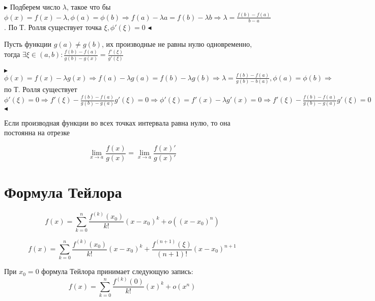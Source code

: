 \documentclass[14pt]{extreport}
\begin{document}
    $\blacktriangleright$
        Подберем число $\lambda$, такое что бы $\phi(x) = f(x) - \lambda, \phi(a) = \phi(b) \Rightarrow f(a) - \lambda a = f(b) - \lambda b \Rightarrow \lambda = \frac{f(b) - f(a)}{b-a}$. По Т. Ролля существует точка $\xi, \phi'(\xi) = 0 $
    $\blacktriangleleft$

    \begin{theorem}
        Пусть функции $g(a) \ne g(b)$, их производные не равны нулю одновременно, тогда $\exists \xi \in (a,b): \frac{f(b) - f(a)}{g(b) - g(x)} = \frac{f'(\xi)}{g'(\xi)}$
    \end{theorem}

    $\blacktriangleright$
        $\phi(x) = f(x) - \lambda g(x) \Rightarrow f(a) - \lambda g(a) = f(b) - \lambda g(b) \Rightarrow \lambda = \frac{f(b) - f(a)}{g(b) - b(a)}, \phi(a) = \phi(b) \Rightarrow$ по Т. Ролля существует $\phi'(\xi) = 0 \Rightarrow f'(\xi) - \frac{f(b) - f(a)}{g(b) - g(a)}g'(\xi) = 0 \Rightarrow \phi'(\xi ) = f'(x) - \lambda g'(x) = 0 \Rightarrow f'(\xi) - \frac{f(b) - f(a)}{g(b) - g(a)} g'(\xi) = 0$ 
    $\blacktriangleleft$

    \begin{theorem}
        Если производная функции во всех точках интервала равна нулю, то она постоянна на отрезке
    \end{theorem}

    \begin{theorem}
        $$\lim_{x\rightarrow a}\frac{f(x)}{g(x)} = \lim_{x\rightarrow a}\frac{f(x)'}{g(x)'} $$
    \end{theorem}

    \section{Формула Тейлора}

    \begin{theorem}
        $$f(x) = \sum^n_{k=0}\frac{f^{(k)} (x_0)}{k!}(x-x_0)^{k} + o((x-x_0)^n)$$
    \end{theorem}

    \begin{theorem}
        $$f(x) = \sum^n_{k=0}\frac{f^{(k)} (x_0)}{k!}(x-x_0)^{k} + \frac{f^{(n+1)}(\xi)}{(n+1)!}(x - x_0)^{n+1}$$
    \end{theorem}

    \begin{definition}
        При $x_0 = 0$ формула Тейлора принимает следующую запись:
        $$f(x) = \sum^n_{k=0}\frac{f^{(k)} (0)}{k!}(x)^{k} + o(x^n)$$
    \end{definition}
\end{document}
